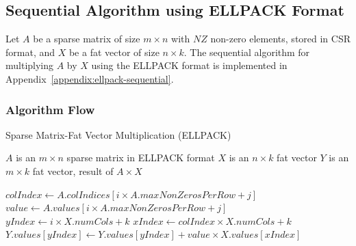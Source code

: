 \documentclass[12pt,oneside]{book} %
\begin{document}
\newpage
\subsection{Sequential Algorithm using ELLPACK Format}
Let \( A \) be a sparse matrix of size \( m \times n \) with \( NZ \) non-zero
elements, stored in CSR format, and \( X \) be a fat vector of size \( n \times
k \). The sequential algorithm for multiplying \( A \) by \( X \) using the
ELLPACK format is implemented in Appendix~\ref{appendix:ellpack-sequential}.

\subsubsection{Algorithm Flow}

\begin{algorithm}[H]
    \caption{Sparse Matrix-Fat Vector Multiplication (ELLPACK)}
    \begin{algorithmic}
        \Require $A$ is an $m \times n$ sparse matrix in ELLPACK format
        \Require $X$ is an $n \times k$ fat vector
        \Ensure  $Y$ is an $m \times k$ fat vector, result of $A \times X$

        \State $colIndex \gets A.colIndices[i \times A.maxNonZerosPerRow + j]$
        \State $value \gets A.values[i \times A.maxNonZerosPerRow + j]$
        \State $yIndex \gets i \times X.numCols + k$
        \State $xIndex \gets colIndex \times X.numCols + k$
        \State $Y.values[yIndex] \gets Y.values[yIndex] + value \times X.values[xIndex]$
        \EndFor
        \EndIf
        \EndFor
        \EndFor
    \end{algorithmic}
\end{algorithm}
\end{document}
